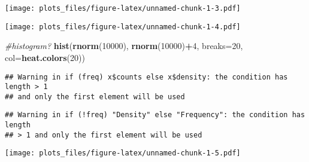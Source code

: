 \documentclass[]{article}
\newenvironment{Shaded}{\begin{snugshade}}{\end{snugshade}}
\newcommand{\KeywordTok}[1]{\textcolor[rgb]{0.13,0.29,0.53}{\textbf{#1}}}
\newcommand{\DataTypeTok}[1]{\textcolor[rgb]{0.13,0.29,0.53}{#1}}
\newcommand{\DecValTok}[1]{\textcolor[rgb]{0.00,0.00,0.81}{#1}}
\newcommand{\CharTok}[1]{\textcolor[rgb]{0.31,0.60,0.02}{#1}}
\newcommand{\StringTok}[1]{\textcolor[rgb]{0.31,0.60,0.02}{#1}}
\newcommand{\CommentTok}[1]{\textcolor[rgb]{0.56,0.35,0.01}{\textit{#1}}}
\newcommand{\OtherTok}[1]{\textcolor[rgb]{0.56,0.35,0.01}{#1}}
\newcommand{\OperatorTok}[1]{\textcolor[rgb]{0.81,0.36,0.00}{\textbf{#1}}}
\newcommand{\NormalTok}[1]{#1}
\begin{document}
\texttt{[image: plots\_files/figure-latex/unnamed-chunk-1-3.pdf]}

\begin{Shaded}
\end{Shaded}

\texttt{[image: plots\_files/figure-latex/unnamed-chunk-1-4.pdf]}

\begin{Shaded}
\begin{Highlighting}[]
\CommentTok{#histogram?}
\KeywordTok{hist}\NormalTok{(}\KeywordTok{rnorm}\NormalTok{(}\DecValTok{10000}\NormalTok{), }\KeywordTok{rnorm}\NormalTok{(}\DecValTok{10000}\NormalTok{)}\OperatorTok{+}\DecValTok{4}\NormalTok{, }\DataTypeTok{breaks=}\DecValTok{20}\NormalTok{, }\DataTypeTok{col=}\KeywordTok{heat.colors}\NormalTok{(}\DecValTok{20}\NormalTok{))}
\end{Highlighting}
\end{Shaded}

\begin{verbatim}
## Warning in if (freq) x$counts else x$density: the condition has length > 1
## and only the first element will be used
\end{verbatim}

\begin{verbatim}
## Warning in if (!freq) "Density" else "Frequency": the condition has length
## > 1 and only the first element will be used
\end{verbatim}

\texttt{[image: plots\_files/figure-latex/unnamed-chunk-1-5.pdf]}
\end{document}
